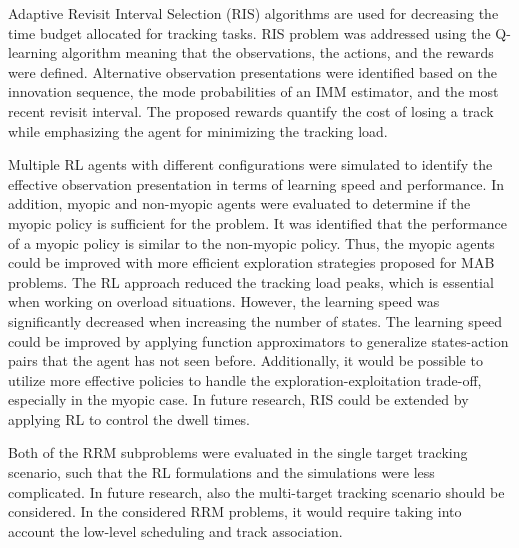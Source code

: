 \documentclass[english, 12pt, a4paper, elec, utf8, a-1b, online]{aaltothesis}
\begin{document}
Adaptive Revisit Interval Selection (RIS) algorithms are used for decreasing the time budget allocated for tracking tasks.
RIS problem was addressed using the Q-learning algorithm meaning that the observations, the actions, and the rewards were defined. 
Alternative observation presentations were identified based on the innovation sequence, the mode probabilities of an IMM estimator, and the most recent revisit interval.
The proposed rewards quantify the cost of losing a track while emphasizing the agent for minimizing the tracking load.

Multiple RL agents with different configurations were simulated to identify the effective observation presentation in terms of learning speed and performance. 
In addition, myopic and non-myopic agents were evaluated to determine if the myopic policy is sufficient for the problem. 
It was identified that the performance of a myopic policy is similar to the non-myopic policy.
Thus, the myopic agents could be improved with more efficient exploration strategies proposed for MAB problems.
The RL approach reduced the tracking load peaks, which is essential when working on overload situations.
However, the learning speed was significantly decreased when increasing the number of states.
The learning speed could be improved by applying function approximators \cite{Sutton2018} to generalize states-action pairs that the agent has not seen before.  
Additionally, it would be possible to utilize more effective policies to handle the exploration-exploitation trade-off, especially in the myopic case.
In future research, RIS could be extended by applying RL to control the dwell times.

Both of the RRM subproblems were evaluated in the single target tracking scenario, such that the RL formulations and the simulations were less complicated. 
In future research, also the multi-target tracking scenario should be considered. 
In the considered RRM problems, it would require taking into account the low-level scheduling and track association. 

\newpage
\thesisbibliography

\printbibliography
\end{document}
